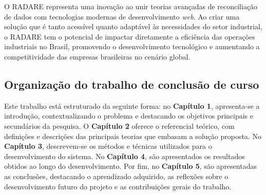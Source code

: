 O RADARE representa uma inovação ao unir teorias avançadas de reconciliação de dados com tecnologias modernas de desenvolvimento \textit{web}. Ao criar uma solução que é tanto acessível quanto adaptável às necessidades do setor industrial, o RADARE tem o potencial de impactar diretamente a eficiência das operações industriais no Brasil, promovendo o desenvolvimento tecnológico e aumentando a competitividade das empresas brasileiras no cenário global.

\subsection{Organização do trabalho de conclusão de curso}

Este trabalho está estruturado da seguinte forma: no \textbf{Capítulo 1}, apresenta-se a introdução, contextualizando o problema e destacando os objetivos principais e secundários da pesquisa. O \textbf{Capítulo 2} oferece o referencial teórico, com definições e descrições das principais teorias que embasam a solução proposta. No \textbf{Capítulo 3}, descrevem-se os métodos e técnicas utilizados para o desenvolvimento do sistema. No \textbf{Capítulo 4}, são apresentados os resultados obtidos ao longo do desenvolvimento. Por fim, no \textbf{Capítulo 5}, são apresentadas as conclusões, destacando o aprendizado adquirido, as reflexões sobre o desenvolvimento futuro do projeto e as contribuições gerais do trabalho.
